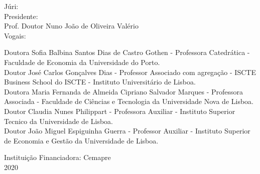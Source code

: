 \begin{titlepage}
\begin{center}
\noindent
\begin{flushleft} \footnotesize
Júri:\\[0.1cm]
Presidente:\\
Prof. Doutor Nuno João de Oliveira Valério\\[0.1cm]
Vogais:\\
\begin{adjustwidth}{0pt}{-10pt}
Doutora Sofia Balbina Santos Dias de Castro Gothen - Professora Catedrática - Faculdade de Economia da Universidade do Porto. \\
Doutor José Carlos Gonçalves Dias - Professor Associado com agregação - ISCTE Business School do ISCTE - Instituto Universitário de Lisboa.\\
Doutora Maria Fernanda de Almeida Cipriano Salvador Marques - Professora Associada - Faculdade de Ciências e Tecnologia da Universidade Nova de Lisboa.\\ 
Doutor Claudia Nunes Philippart - Professora Auxiliar - Instituto Superior Tecnico da Universidade de Lisboa.\\
Doutor João Miguel Espiguinha Guerra - Professor Auxiliar - Instituto Superior de Economia e Gestão da Universidade de Lisboa.
\end{adjustwidth} 
\end{flushleft}
\vspace{0.5em}

{Instituição Financiadora:  Cemapre}\\
\vspace{1.5em}
{\large 2020}\\[0.1cm]

\end{center}
\end{titlepage}